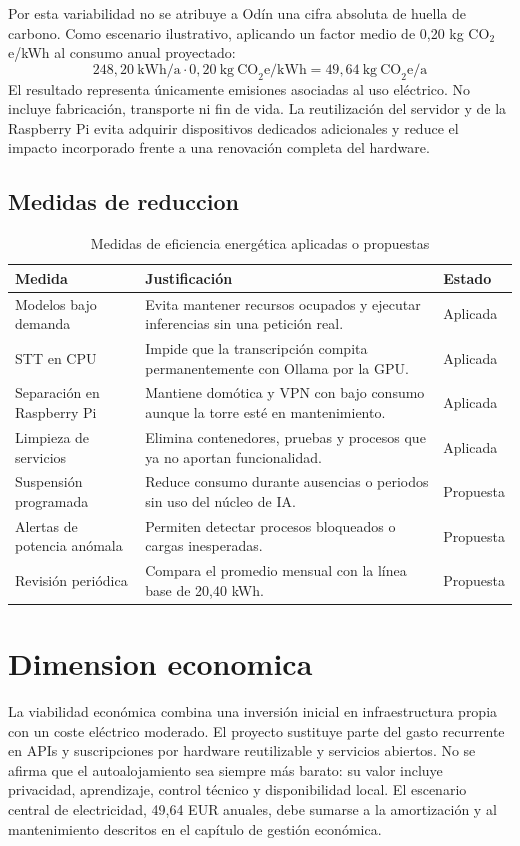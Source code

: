 Por esta variabilidad no se atribuye a Odín una cifra absoluta de huella de carbono. Como escenario ilustrativo, aplicando un factor medio de 0,20 kg CO\(_2\)e/kWh al consumo anual proyectado:
\[
  248,20\ \mathrm{kWh/a} \cdot 0,20\ \mathrm{kg\ CO}_{2}\mathrm{e/kWh}
  = 49,64\ \mathrm{kg\ CO}_{2}\mathrm{e/a}
\]
El resultado representa únicamente emisiones asociadas al uso eléctrico. No incluye fabricación, transporte ni fin de vida. La reutilización del servidor y de la Raspberry Pi evita adquirir dispositivos dedicados adicionales y reduce el impacto incorporado frente a una renovación completa del hardware.

\subsection{Medidas de reduccion}
\begin{table}[H]
  \centering
  \caption{Medidas de eficiencia energética aplicadas o propuestas}
  \label{tab:medidas-eficiencia}
  \small
  \begin{tabularx}{\textwidth}{p{}Xp{}}
    \toprule
    Medida & Justificación & Estado \\
    \midrule
    Modelos bajo demanda & Evita mantener recursos ocupados y ejecutar inferencias sin una petición real. & Aplicada \\
    STT en CPU & Impide que la transcripción compita permanentemente con Ollama por la GPU. & Aplicada \\
    Separación en Raspberry Pi & Mantiene domótica y VPN con bajo consumo aunque la torre esté en mantenimiento. & Aplicada \\
    Limpieza de servicios & Elimina contenedores, pruebas y procesos que ya no aportan funcionalidad. & Aplicada \\
    Suspensión programada & Reduce consumo durante ausencias o periodos sin uso del núcleo de IA. & Propuesta \\
    Alertas de potencia anómala & Permiten detectar procesos bloqueados o cargas inesperadas. & Propuesta \\
    Revisión periódica & Compara el promedio mensual con la línea base de 20,40 kWh. & Propuesta \\
    \bottomrule
  \end{tabularx}
\end{table}

\section{Dimension economica}
La viabilidad económica combina una inversión inicial en infraestructura propia con un coste eléctrico moderado. El proyecto sustituye parte del gasto recurrente en APIs y suscripciones por hardware reutilizable y servicios abiertos. No se afirma que el autoalojamiento sea siempre más barato: su valor incluye privacidad, aprendizaje, control técnico y disponibilidad local. El escenario central de electricidad, 49,64 EUR anuales, debe sumarse a la amortización y al mantenimiento descritos en el capítulo de gestión económica.

